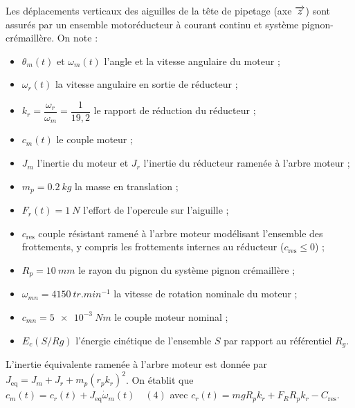 \documentclass[10pt,fleqn]{article} %
\begin{document}
Les déplacements verticaux des aiguilles de la tête de pipetage (axe $\overrightarrow{z}$) sont assurés par un ensemble motoréducteur à courant continu et système pignon-crémaillère.
On note :
\begin{itemize}
\item $ \theta_m(t)$ et $\omega_m(t)$ l’angle et la vitesse angulaire du moteur ;
\item $\omega_r(t)$ la vitesse angulaire en sortie de réducteur ;
\item $k_r=\dfrac{\omega_r}{\omega_m}=\dfrac{1}{19,2}$ le rapport de réduction du réducteur ;
\item $c_m(t)$ le couple moteur ;
\item $J_m$ l’inertie du moteur et $J_r$ l'inertie du réducteur ramenée à l’arbre moteur ;
\item $m_p = \SI{0,2}{kg}$ la masse en translation ;
\item $F_r(t) = \SI{1}{N}$ l’effort de l’opercule sur l’aiguille ;
\item $c_{\text{res}}$ couple résistant ramené à l’arbre moteur modélisant l’ensemble des frottements, y compris les frottements internes au réducteur ($c_{\text{res}}\leq 0$) ;
\item $R_p = \SI{10}{mm}$ le rayon du pignon du système pignon crémaillère ;
\item $\omega_{mn} = \SI{4 150}{tr.min^{-1}}$ la vitesse de rotation nominale du moteur ;
\item $c_{mn}= \SI{5e-3}{Nm}$ le couple moteur nominal ;
\item $E_c\left(S/Rg\right)$ l’énergie cinétique de l’ensemble $S$ par rapport au référentiel $R_g$.
\end{itemize}

L'inertie équivalente ramenée à l'arbre moteur est donnée par $J_{\text{eq}}=J_m+J_r+m_p\left(r_p k_r \right)^2$. On établit que $c_m(t)=c_r(t)+J_{\text{eq}}\dot{\omega}_m(t) \quad (4)$ avec $c_r(t)=mgR_p k_r + F_R R_pk_r - C_{\text{res}}$.
\end{document}
